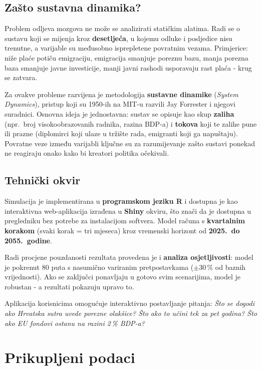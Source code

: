 \documentclass[11pt,a4paper]{article}
\begin{document}
\subsection*{Zašto sustavna dinamika?}

Problem odljeva mozgova ne može se analizirati statičkim alatima. Radi se o sustavu koji se mijenja kroz \textbf{desetljeća}, u kojemu odluke i posljedice nisu trenutne, a varijable su međusobno isprepletene povratnim vezama. Primjerice: niže plaće potiču emigraciju, emigracija smanjuje poreznu bazu, manja porezna baza smanjuje javne investicije, manji javni rashodi usporavaju rast plaća  - krug se zatvara.

Za ovakve probleme razvijena je metodologija \textbf{sustavne dinamike} (\textit{System Dynamics}), pristup koji su 1950-ih na MIT-u razvili Jay Forrester i njegovi suradnici. Osnovna ideja je jednostavna: sustav se opisuje kao skup \textbf{zaliha} (npr.\ broj visokoobrazovanih radnika, razina BDP-a) i \textbf{tokova} koji te zalihe pune ili prazne (diplomirci koji ulaze u tržište rada, emigranti koji ga napuštaju). Povratne veze između varijabli ključne su za razumijevanje zašto sustavi ponekad ne reagiraju onako kako bi kreatori politika očekivali.

\subsection*{Tehnički okvir}

Simulacija je implementirana u \textbf{programskom jeziku R} i dostupna je kao interaktivna web-aplikacija izrađena u \textbf{Shiny} okviru, što znači da je dostupna u pregledniku bez potrebe za instalacijom softvera. Model računa s \textbf{kvartalnim korakom} (svaki korak = tri mjeseca) kroz vremenski horizont od \textbf{2025.\ do 2055.\ godine}.

Radi procjene pouzdanosti rezultata provedena je i \textbf{analiza osjetljivosti}: model je pokrenut 80 puta s nasumično variranim pretpostavkama ($\pm 30\,\%$ od baznih vrijednosti). Ako se zaključci ponavljaju u gotovo svim scenarijima, model je robustan  - a rezultati pokazuju upravo to.

Aplikacija korisnicima omogućuje interaktivno postavljanje pitanja: \textit{Što se dogodi ako Hrvatska sutra uvede porezne olakšice? Što ako to učini tek za pet godina? Što ako EU fondovi ostanu na razini 2\,\% BDP-a?}

\section{Prikupljeni podaci}
\end{document}
